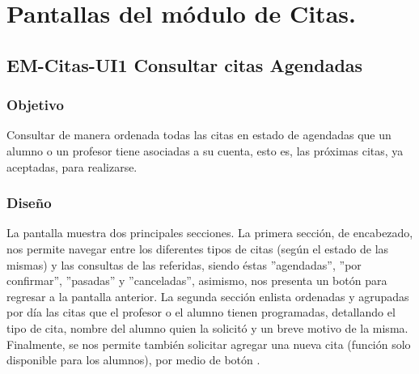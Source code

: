 


\section{Pantallas del módulo de Citas.}

\subsection{EM-Citas-UI1 Consultar citas Agendadas}

\subsubsection{Objetivo}
	\noindent
	Consultar de manera ordenada todas las citas en estado de agendadas que un alumno o un profesor tiene asociadas a su cuenta, esto es, las próximas citas, ya aceptadas, para realizarse.

\subsubsection{Diseño}
	\noindent
	La pantalla muestra dos principales secciones. La primera sección, de encabezado, nos permite navegar entre los diferentes tipos de citas (según el estado de las mismas) y las consultas de las referidas, siendo éstas ''agendadas'', ''por confirmar'', ''pasadas'' y ''canceladas'', asimismo, nos presenta un botón para regresar a la pantalla anterior.
	\newline
	La segunda sección enlista ordenadas y agrupadas por día las citas que el profesor o el alumno tienen programadas, detallando el tipo de cita, nombre del alumno quien la solicitó y un breve motivo de la misma. 
	\newline
	Finalmente, se nos permite también solicitar agregar una nueva cita (función solo disponible para los alumnos), por medio de botón \IUbutton{ + }.

\pagebreak
{}

